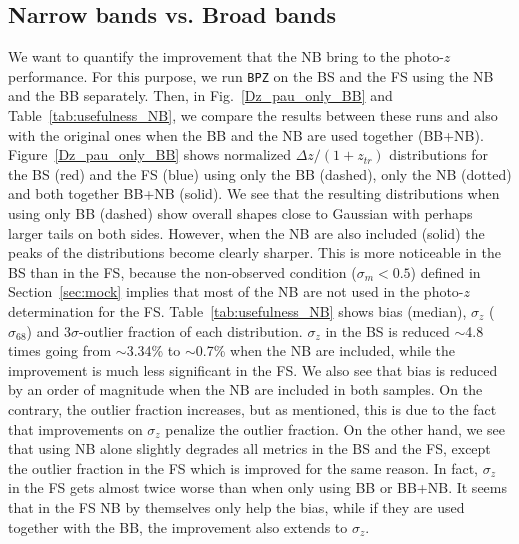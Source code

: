 \subsection{Narrow bands vs. Broad bands}
We want to quantify the improvement that the NB bring to the photo-$z$ performance. For this purpose, we run \texttt{BPZ} on the BS and the FS using the NB and the BB separately. Then, in Fig.~\ref{Dz_pau_only_BB} and Table~\ref{tab:usefulness_NB}, we compare the results between these runs and also with the original ones when the BB and the NB are used together (BB+NB). Figure~\ref{Dz_pau_only_BB} shows normalized $\Delta z/(1+z_{tr})$ distributions for the BS (red) and the FS (blue) using only the BB (dashed), only the NB (dotted) and both together BB+NB (solid). We see that the resulting distributions when using only BB (dashed) show overall shapes close to Gaussian with perhaps larger tails on both sides. However, when the NB are also included (solid) the peaks of the distributions become clearly sharper. This is more noticeable in the BS than in the FS, because the non-observed condition ($\sigma_m<0.5$) defined in Section~\ref{sec:mock} implies that most of the NB are not used in the photo-$z$ determination for the FS. Table~\ref{tab:usefulness_NB} shows bias (median), $\sigma_z$ ($\sigma_{68}$) and $3\sigma$-outlier fraction of each distribution. $\sigma_z$ in the BS is reduced $\sim$4.8 times going from $\sim$3.34\% to $\sim$0.7\% when the NB are included, while the improvement is much less significant in the FS. We also see that bias is reduced by an order of magnitude when the NB are included in both samples. On the contrary, the outlier fraction increases, but as mentioned, this is due to the fact that improvements on $\sigma_z$ penalize the outlier fraction. On the other hand, we see that using NB alone slightly degrades all metrics in the BS and the FS, except the outlier fraction in the FS which is improved for the same reason. In fact, $\sigma_z$ in the FS gets almost twice worse than when only using BB or BB+NB. It seems that in the FS NB by themselves only help the bias, while if they are used together with the BB, the improvement also extends to $\sigma_z$.
